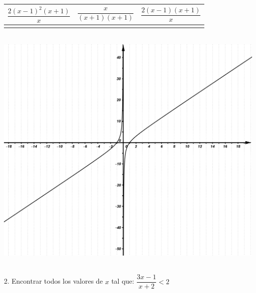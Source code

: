 \documentclass[a4paper,11pt,spanish,sans]{exam}
\newcommand{\Ts}{\rule{0pt}{2.8ex}}       %
\newcommand{\Bs}{\rule[-1.5ex]{0pt}{0pt}} %
\begin{document}
	\begin{minipage}{.5\textwidth}
		\centering
		\begin{tabular}{|c|c|c|}
			\hline
			$\dfrac{2(x-1)^2(x+1)}{x}$  & $\dfrac{x}{(x+1)(x+1)}$ & $\dfrac{2(x-1)(x+1)}{x}$ \Ts \Bs   \\ \hline
			&   &      \\ \hline
		\end{tabular}\\
		\centering
		\includegraphics[width= 0.95\linewidth]{dadic4.png}
	\end{minipage}\\
2. Encontrar todos los valores de $x$ tal que: $\dfrac{3x-1}{x+2}<2$

\setcounter{section}{0}

\newpage
\end{document}
